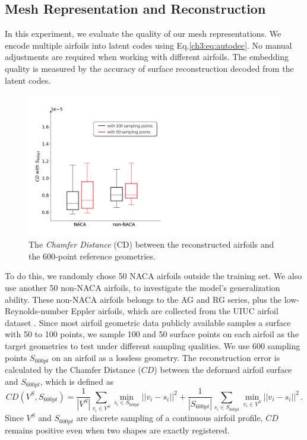 \subsection{Mesh Representation and Reconstruction}
\label{ch3:sec:reconstruction}
In this experiment, we evaluate the quality of our mesh representations.
We encode multiple airfoils into latent codes using Eq.\ref{ch3:eq:autodec}.
No manual adjustments are required when working with different airfoils.
The embedding quality is measured by the accuracy of surface reconstruction decoded from the latent codes.

\begin{figure}[th]
	\begin{center}
		\includegraphics[width=0.5\linewidth]{chapter3/tex/figures/experiment/reconstruction_evaluation.pdf}
	\end{center}
	\caption{
		\small The \textit{Chamfer Distance} (CD) between the reconstructed airfoils and the 600-point reference geometries.
	}
	\label{ch3:fig:exp_recon_eval}
\end{figure}

To do this, we randomly chose 50 NACA airfoils outside the training set.
We also use another 50 non-NACA airfoils, to investigate the model's generalization ability.
These non-NACA airfoils belongs to the AG and RG series, plus the low-Reynolds-number Eppler airfoils, which are collected from the UIUC airfoil dataset \cite{aa.Selig1996}.
Since most airfoil geometric data publicly available samples a surface with 50 to 100 points, we sample 100 and 50 surface points on each airfoil as the target geometries to test  under different sampling qualities.
We use 600 sampling points $S_{600pt}$ on an airfoil as a lossless geometry.
The reconstruction error is calculated by the Chamfer Distance \cite{ai.Barrow1977} ($CD$) between the deformed airfoil surface and  $S_{600pt}$, which is defined as
\begin{equation}
    CD({V^S},{S_{600pt}}) = \frac{1}{{|{V^S}|}}\sum\limits_{{v_i} \in {V^S}} {\mathop {\min }\limits_{{s_i} \in {S_{600pt}}} ||{v_i} - {s_i}|{|^2}}  + \frac{1}{{|{S_{600pt}}|}}\sum\limits_{{s_i} \in {S_{600pt}}} {\mathop {\min }\limits_{{v_i} \in {V^S}} ||{v_i} - {s_i}|{|^2}} \,.
\end{equation}
Since $V^S$ and $S_{600pt}$ are discrete sampling of a continuous airfoil profile, $CD$ remains positive even when two shapes are exactly registered.

